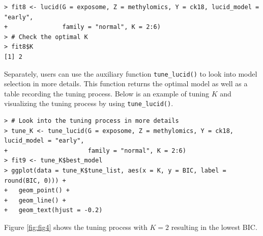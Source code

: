 \begin{verbatim}
> fit8 <- lucid(G = exposome, Z = methylomics, Y = ck18, lucid_model = "early", 
+               family = "normal", K = 2:6)
> # Check the optimal K
> fit8$K
[1] 2
\end{verbatim}

Separately, users can use the auxiliary function \texttt{tune\_lucid()} to look
into model selection in more details. This function returns the optimal
model as well as a table recording the tuning process. Below is an
example of tuning \(K\) and visualizing the tuning process by using
\texttt{tune\_lucid()}.

\begin{verbatim}
> # Look into the tuning process in more details
> tune_K <- tune_lucid(G = exposome, Z = methylomics, Y = ck18, lucid_model = "early", 
+                      family = "normal", K = 2:6)
> fit9 <- tune_K$best_model
> ggplot(data = tune_K$tune_list, aes(x = K, y = BIC, label = round(BIC, 0))) + 
+   geom_point() +
+   geom_line() + 
+   geom_text(hjust = -0.2)
\end{verbatim}

Figure \ref{fig:fig4} shows the tuning process with \(K = 2\) resulting
in the lowest BIC.

